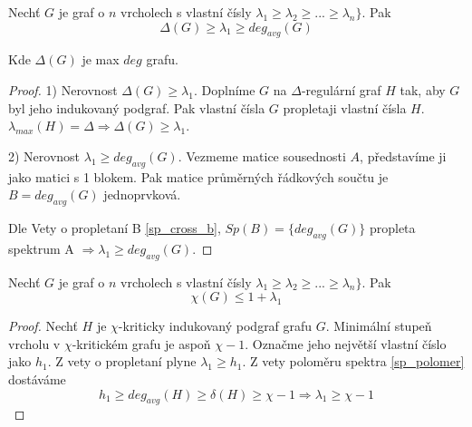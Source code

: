 \begin{theorem}\label{sp_polomer}
	Nechť $G$ je graf o $n$ vrcholech s vlastní čísly $\lambda_1 \geq \lambda_2 \geq ... \geq \lambda_n \}$. Pak
	\[ \Delta(G) \geq \lambda_1 \geq deg_{avg}(G) \]

	Kde $\Delta(G)$ je max $deg$ grafu.
\end{theorem}
\begin{proof}
	1) Nerovnost $\Delta(G) \geq \lambda_1$. Doplníme $G$ na $\Delta$-regulární graf $H$ tak, aby $G$ byl jeho indukovaný podgraf. Pak vlastní čísla $G$ propletaji vlastní čísla $H$. $\lambda_{max}(H) = \Delta \Rightarrow \Delta(G) \geq \lambda_1$.

	2) Nerovnost $\lambda_1 \geq deg_{avg}(G)$.
	Vezmeme matice sousednosti $A$, představíme ji jako matici s 1 blokem. Pak matice průměrných řádkových součtu je $B = deg_{avg}(G)$ jednoprvková.

	Dle Vety o propletaní B \cref{sp_cross_b}, $Sp(B) = \{ deg_{avg}(G)\}$ propleta spektrum A $\Rightarrow \lambda_1 \geq deg_{avg}(G)$.
\end{proof}

\begin{theorem}
	Nechť $G$ je graf o $n$ vrcholech s vlastní čísly $\lambda_1 \geq \lambda_2 \geq ... \geq \lambda_n \}$. Pak
	\[ \chi(G) \leq 1 + \lambda_1 \]
\end{theorem}
\begin{proof}
	Nechť $H$ je $\chi$-kriticky indukovaný podgraf grafu $G$. Minimální stupeň vrcholu v $\chi$-kritickém grafu je aspoň $\chi - 1$.
	Označme jeho největší vlastní číslo jako $h_1$. Z vety o propletaní plyne $\lambda_1 \geq h_1$.
	Z vety poloměru spektra \cref{sp_polomer} dostáváme
	\[ h_1 \geq deg_{avg}(H) \geq \delta(H) \geq \chi - 1 \Rightarrow \lambda_1 \geq \chi - 1 \]
\end{proof}

